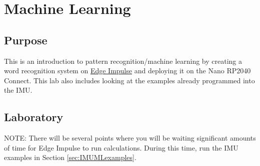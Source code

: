 \chapter{Machine Learning}

\section{Purpose}
This is an introduction to pattern recognition/machine learning by creating a 
word recognition system on \href{https://edgeimpulse.com/}{Edge Impulse} and 
deploying it on the Nano RP2040 Connect. This lab also includes looking at 
the examples already programmed into the IMU.

\section{Laboratory}
NOTE: There will be several points where you will be waiting significant amounts of 
time for Edge Impulse to run calculations. During this time, run the IMU examples 
in Section \ref{sec:IMUMLexamples}.

